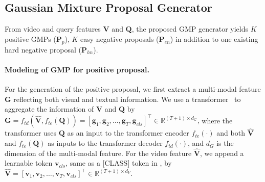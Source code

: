 \subsection{Gaussian Mixture Proposal Generator}
\label{sec:proposal-generator}

From video and query features $\mathbf{V}$ and $\mathbf{Q}$, the proposed  GMP  generator yields $K$ positive GMPs ($\mathbf{P}_{p}$), $K$ easy negative proposals ($\mathbf{P}_{en}$) in addition to one existing  hard negative proposal ($\mathbf{P}_{hn}$).

\paragraph{Modeling of GMP for positive proposal.}
For the generation of the positive proposal, we first extract a multi-modal feature $\mathbf{G}$ reflecting both visual and textual information.
We use a transformer~\cite{vaswani2017attention} to aggregate the information of $\mathbf{V}$ and $\mathbf{Q}$ by
\begin{math}
  \mathbf{G}=f_{td}(\widehat{\mathbf{V}}, f_{te}(\mathbf{Q})) =[\mathbf{g}_1,\mathbf{g}_2,\dots,\mathbf{g}_{T},\mathbf{g}_{cls}]^\top\in \mathbb{R}^{(T+1)\times d_G}\text{,}
\end{math}
where the transformer uses $\mathbf{Q}$ as an input to the transformer encoder $f_{te}(\cdot)$ and both $\widehat{\mathbf{V}}$ and $f_{te}(\mathbf{Q})$ as inputs to the transformer decoder $f_{td}(\cdot)$, and $d_G$ is the dimension of the multi-modal feature.
For the video feature $\widehat{\mathbf{V}}$, we append a learnable token $\mathbf{v}_{cls}$, same as a [CLASS] token in \cite{devlin2018bert}, by
$\widehat{\mathbf{V}}=[\mathbf{v}_1,\mathbf{v}_2,\dots,\mathbf{v}_T, \mathbf{v}_{cls}]^\top \in \mathbb{R}^{(T+1)\times d_V}$.
